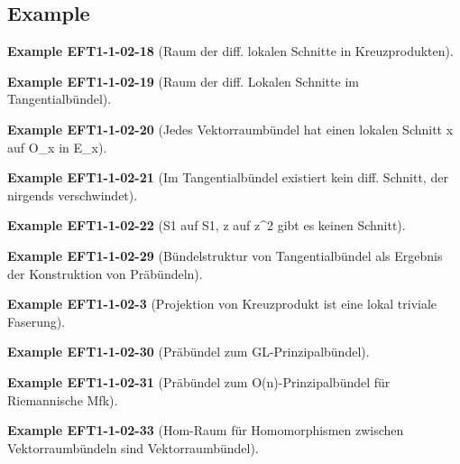 \documentclass[10pt, letterpaper]{article}
\newcommand{\CustomHeading}[3]{%
  \par\medskip\noindent%
  \textbf{#1 #2} \textnormal{(#3)}.\enskip%
}
\newenvironment{EXA}[2]{\CustomHeading{Example}{#1}{#2}}{}
\begin{document}
\subsection{Example}

\begin{EXA}{EFT1-1-02-18}{Raum der diff. lokalen Schnitte in Kreuzprodukten}

\end{EXA}

\begin{EXA}{EFT1-1-02-19}{Raum der diff. Lokalen Schnitte im Tangentialbündel}

\end{EXA}

\begin{EXA}{EFT1-1-02-20}{Jedes Vektorraumbündel hat einen lokalen Schnitt x auf O_x in E_x}

\end{EXA}

\begin{EXA}{EFT1-1-02-21}{Im Tangentialbündel existiert kein diff. Schnitt, der nirgends verschwindet}

\end{EXA}

\begin{EXA}{EFT1-1-02-22}{S1 auf S1, z auf z^2 gibt es keinen Schnitt}

\end{EXA}

\begin{EXA}{EFT1-1-02-29}{Bündelstruktur von Tangentialbündel als Ergebnis der Konstruktion von Präbündeln}

\end{EXA}

\begin{EXA}{EFT1-1-02-3}{Projektion von Kreuzprodukt ist eine lokal triviale Faserung}

\end{EXA}

\begin{EXA}{EFT1-1-02-30}{Präbündel zum GL-Prinzipalbündel}

\end{EXA}

\begin{EXA}{EFT1-1-02-31}{Präbündel zum O(n)-Prinzipalbündel für Riemannische Mfk}

\end{EXA}

\begin{EXA}{EFT1-1-02-33}{Hom-Raum für Homomorphismen zwischen Vektorraumbündeln sind Vektorraumbündel}

\end{EXA}
\end{document}
